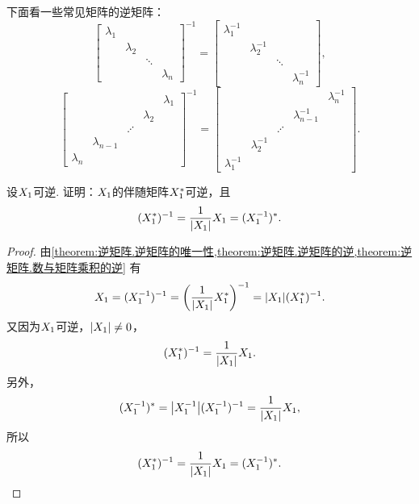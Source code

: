 \begin{example}
下面看一些常见矩阵的逆矩阵：
\[
	\begin{bmatrix}
		\lambda_1 \\
		& \lambda_2 \\
		&& \ddots \\
		&&& \lambda_n
	\end{bmatrix}^{-1}
	= \begin{bmatrix}
		\lambda_1^{-1} \\
		& \lambda_2^{-1} \\
		&& \ddots \\
		&&& \lambda_n^{-1}
	\end{bmatrix},
\]\[
	\begin{bmatrix}
		& & & & \lambda_1 \\
		& & & \lambda_2 \\
		& & \iddots \\
		& \lambda_{n-1} \\
		\lambda_n
	\end{bmatrix}^{-1}
	= \begin{bmatrix}
		& & & & \lambda_n^{-1} \\
		& & & \lambda_{n-1}^{-1} \\
		& & \iddots \\
		& \lambda_2^{-1} \\
		\lambda_1^{-1}
	\end{bmatrix}.
\]
\end{example}

\begin{example}
设\(X_1\)可逆.
证明：\(X_1\)的伴随矩阵\(X_1^*\)可逆，且
\begin{equation}
	(X_1^*)^{-1}=\frac{1}{\abs{X_1}}X_1=(X_1^{-1})^*.
\end{equation}
\begin{proof}
由\cref{theorem:逆矩阵.逆矩阵的唯一性,theorem:逆矩阵.逆矩阵的逆,theorem:逆矩阵.数与矩阵乘积的逆} 有\[
	X_1
	= (X_1^{-1})^{-1}
	= \left( \frac{1}{\abs{X_1}} X_1^* \right)^{-1}
	= \abs{X_1} (X_1^*)^{-1}.
\]
又因为\(X_1\)可逆，\(\abs{X_1}\neq0\)，\[
	(X_1^*)^{-1} = \frac{1}{\abs{X_1}} X_1.
\]
另外，\[
	(X_1^{-1})^* = \abs{X_1^{-1}} (X_1^{-1})^{-1}
	= \frac{1}{\abs{X_1}} X_1,
\]
所以\[
	(X_1^*)^{-1}=\frac{1}{\abs{X_1}}X_1=(X_1^{-1})^*.
	\qedhere
\]
\end{proof}
\end{example}


